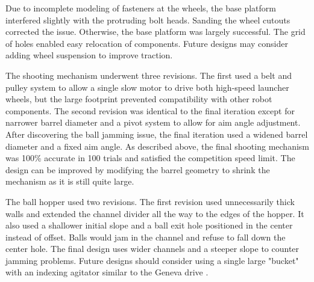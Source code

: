 Due to incomplete modeling of fasteners at the wheels, the base platform interfered slightly with the protruding bolt heads. Sanding the wheel cutouts corrected the issue. Otherwise, the base platform was largely successful. The grid of holes enabled easy relocation of components. Future designs may consider adding wheel suspension to improve traction.

The shooting mechanism underwent three revisions. The first used a belt and pulley system to allow a single slow motor to drive both high-speed launcher wheels, but the large footprint prevented compatibility with other robot components. The second revision was identical to the final iteration except for narrower barrel diameter and a pivot system to allow for aim angle adjustment. After discovering the ball jamming issue, the final iteration used a widened barrel diameter and a fixed aim angle. As described above, the final shooting mechanism was 100\% accurate in 100 trials and satisfied the competition speed limit. The design can be improved by modifying the barrel geometry to shrink the mechanism as it is still quite large.

The ball hopper used two revisions. The first revision used unnecessarily thick walls and extended the channel divider all the way to the edges of the hopper. It also used a shallower initial slope and a ball exit hole positioned in the center instead of offset. Balls would jam in the channel and refuse to fall down the center hole. The final design uses wider channels and a steeper slope to counter jamming problems. Future designs should consider using a single large "bucket" with an indexing agitator similar to the Geneva drive \cite{bickford_1972}.


